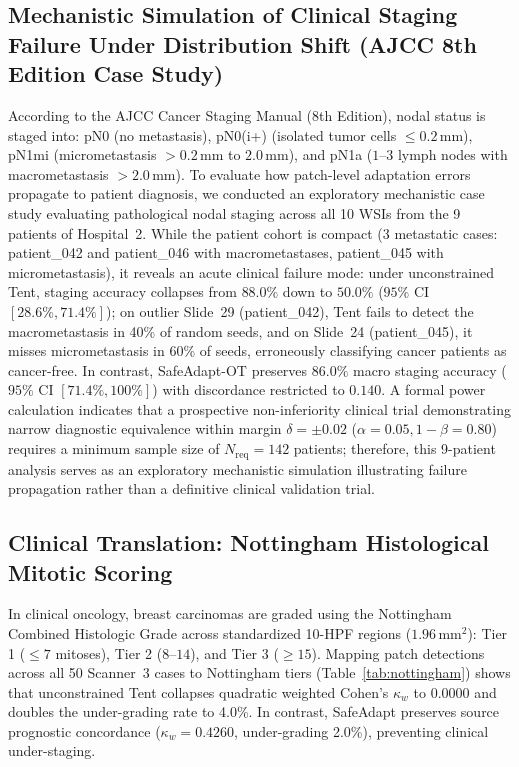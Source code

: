 \documentclass[journal]{IEEEtran}
\begin{document}
\subsection{Mechanistic Simulation of Clinical Staging Failure Under Distribution Shift (AJCC 8th Edition Case Study)}
According to the AJCC Cancer Staging Manual (8th Edition), nodal status is staged into: pN0 (no metastasis), pN0(i+) (isolated tumor cells $\le 0.2$\,mm), pN1mi (micrometastasis $>0.2$\,mm to $2.0$\,mm), and pN1a ($1$--$3$ lymph nodes with macrometastasis $>2.0$\,mm). To evaluate how patch-level adaptation errors propagate to patient diagnosis, we conducted an exploratory mechanistic case study evaluating pathological nodal staging across all 10 WSIs from the 9 patients of Hospital~2. While the patient cohort is compact (3 metastatic cases: patient\_042 and patient\_046 with macrometastases, patient\_045 with micrometastasis), it reveals an acute clinical failure mode: under unconstrained Tent, staging accuracy collapses from $88.0\%$ down to $\mathbf{50.0\%}$ ($95\%$ CI $[28.6\%, 71.4\%]$); on outlier Slide~29 (patient\_042), Tent fails to detect the macrometastasis in 40\% of random seeds, and on Slide~24 (patient\_045), it misses micrometastasis in 60\% of seeds, erroneously classifying cancer patients as cancer-free. In contrast, SafeAdapt-OT preserves $86.0\%$ macro staging accuracy ($95\%$ CI $[71.4\%, 100\%]$) with discordance restricted to $0.140$. A formal power calculation indicates that a prospective non-inferiority clinical trial demonstrating narrow diagnostic equivalence within margin $\delta = \pm 0.02$ ($\alpha = 0.05, 1 - \beta = 0.80$) requires a minimum sample size of $N_{\text{req}} = 142$ patients; therefore, this 9-patient analysis serves as an exploratory mechanistic simulation illustrating failure propagation rather than a definitive clinical validation trial.

\subsection{Clinical Translation: Nottingham Histological Mitotic Scoring}
In clinical oncology, breast carcinomas are graded using the Nottingham Combined Histologic Grade across standardized 10-HPF regions ($1.96\,\mathrm{mm}^2$): Tier 1 ($\le 7$ mitoses), Tier 2 ($8$--$14$), and Tier 3 ($\ge 15$). Mapping patch detections across all 50 Scanner~3 cases to Nottingham tiers (Table~\ref{tab:nottingham}) shows that unconstrained Tent collapses quadratic weighted Cohen's $\kappa_w$ to $0.0000$ and doubles the under-grading rate to 4.0\%. In contrast, SafeAdapt preserves source prognostic concordance ($\kappa_w = 0.4260$, under-grading 2.0\%), preventing clinical under-staging.
\end{document}
